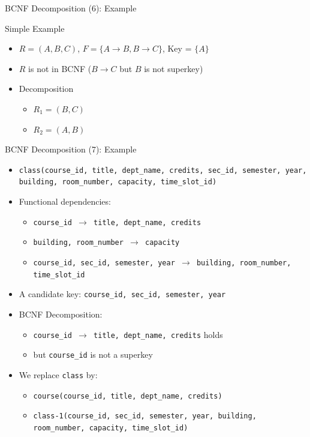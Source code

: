 \documentclass[aspectratio=169, xcolor=dvipsnames]{beamer}
\begin{document}
\begin{frame}{BCNF Decomposition (6): Example}
    \begin{exampleblock}{Simple Example}
        \begin{itemize}[<+->]
            \item $R = (A, B, C)$, $F = \{A \rightarrow B, B \rightarrow C\}$, Key = $\{A\}$
            \item $R$ is not in BCNF ($B \rightarrow C$ but $B$ is not superkey)
            \item Decomposition
            \begin{itemize}
                \item[$\triangleright$] $R_1 = (B, C)$
                \item[$\triangleright$] $R_2 = (A, B)$
            \end{itemize}
        \end{itemize}
    \end{exampleblock}
\end{frame}

\begin{frame}{BCNF Decomposition (7): Example}
    \begin{itemize}[<+->]
        \item \texttt{class(course\_id, title, dept\_name, credits, sec\_id, semester, year, building, room\_number, capacity, time\_slot\_id)}
        \item Functional dependencies:
        \begin{itemize}
            \item[$\triangleright$] \texttt{course\_id $\rightarrow$ title, dept\_name, credits}
            \item[$\triangleright$] \texttt{building, room\_number $\rightarrow$ capacity}
            \item[$\triangleright$] \texttt{course\_id, sec\_id, semester, year $\rightarrow$ building, room\_number, time\_slot\_id}
        \end{itemize}
        \item A candidate key: \texttt{course\_id, sec\_id, semester, year}
        \item BCNF Decomposition:
        \begin{itemize}
            \item[$\triangleright$] \texttt{course\_id $\rightarrow$ title, dept\_name, credits} holds
            \item[$\triangleright$] but \texttt{course\_id} is not a superkey
        \end{itemize}
        \item We replace \texttt{class} by:
        \begin{itemize}
            \item[$\triangleright$] \texttt{course(course\_id, title, dept\_name, credits)}
            \item[$\triangleright$] \texttt{class-1(course\_id, sec\_id, semester, year, building, room\_number, capacity, time\_slot\_id)}
        \end{itemize}
    \end{itemize}
\end{frame}
\end{document}
